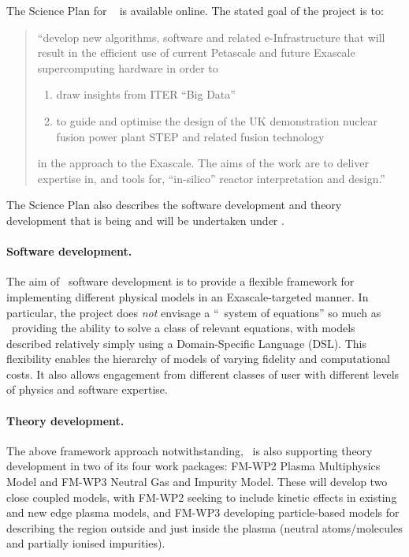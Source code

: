 The Science Plan for \nep\ \cite{sciplan} is available
online.
The stated goal of the project is to:
{\green 
\begin{quote}
	``develop new algorithms, software and related e-Infrastructure that will result in the efficient use of current Petascale and future Exascale supercomputing hardware in order to
\begin{enumerate}
	\item draw insights from ITER ``Big Data''
	\item to guide and optimise the design of the UK demonstration nuclear
		fusion power plant STEP and related fusion technology
\end{enumerate}
in the approach to the Exascale. The aims of the work are to deliver expertise in,
and tools for, ``in-silico'' reactor interpretation and design.''
\end{quote}}

The Science Plan also describes the software development and theory development
that is being and will be undertaken under \nep.

\paragraph{Software development.}
The aim of \nep\ software development is to provide a flexible framework for
implementing different physical models in an Exascale-targeted manner.
In particular, the project does \emph{not} envisage a ``\nep\ system of equations'' so
much as \nep\ providing the ability to solve a class of relevant equations,
with models described relatively simply using a Domain-Specific Language (DSL).
This flexibility enables the hierarchy of models of varying fidelity and
computational costs.
It also allows engagement from different classes of user with different levels
of physics and software expertise.

\paragraph{Theory development.}
The above framework approach notwithstanding,
\nep\ is also supporting theory development in two of its four work packages:
FM-WP2 Plasma Multiphysics Model and FM-WP3 Neutral Gas and Impurity Model.
These will develop two close coupled models, with FM-WP2 seeking to include
kinetic effects in existing and new edge plasma models, and FM-WP3 developing
particle-based models for describing the region outside and just inside the
plasma (neutral atoms/molecules and partially ionised impurities).

